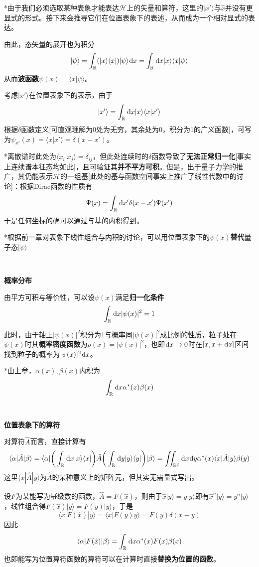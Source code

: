 \documentclass[a4paper,UTF8,fontset=windows]{ctexart}
\newcommand*{\dr}{\hspace{0.07em}\mathrm{d}}
\newcommand*{\ket}[1]{|#1\rangle}
\newcommand*{\bra}[1]{\langle#1|}
\newcommand*{\bk}[2]{\langle#1|#2\rangle}
\newcommand*{\blk}[3]{\langle#1|#2|#3\rangle}
\begin{document}
*由于我们必须选取某种表象才能表达$\mathcal{H}$上的矢量和算符，这里的$\ket{x'}$与$\hat{x}$并没有更显式的形式。接下来会推导它们在位置表象下的表述，从而成为一个相对显式的表达。

由此，态矢量的展开也为积分
$$\ket{\psi}=\int_\mathbb{R}(\ket{x}\bra{x})\ket{\psi}\dr x=\int_\mathbb{R}\dr x\ket{x}\bk{x}{\psi}$$
从而\textbf{波函数}$\psi(x)=\bk{x}{\psi}$。

考虑$\ket{x'}$在位置表象下的表示，由于
$$\ket{x'}=\int_\mathbb{R}\dr x\ket{x}\bk{x}{x'}$$
根据$\delta$函数定义[可直观理解为0处为无穷，其余处为0，积分为1的广义函数]，可写为$\psi_{x'}(x)=\bk{x}{x'}=\delta(x-x')$。

*离散谱时此处为$\bk{x_i}{x_j}=\delta_{ij}$，但此处连续时的$\delta$函数导致了\textbf{无法正常归一化}[事实上连续谱本征态均如此]，且可验证其\textbf{并不平方可积}。但是，出于量子力学的推广，其仍能表示$\mathcal{H}$的一组基[此处的基与函数空间事实上推广了线性代数中的讨论]：根据Dirac函数的性质有
$$\Psi(x)=\int_\mathbb{R}\dr x'\delta(x-x')\Psi(x')$$
于是任何坐标的确可以通过与基的内积得到。

*根据前一章对表象下线性组合与内积的讨论，可以用位置表象下的$\psi(x)$\textbf{替代}量子态$\ket{\psi}$

\

\textbf{概率分布}

由平方可积与等价性，可以设$\psi(x)$满足\textbf{归一化条件}
$$\int_\mathbb{R}\dr x|\psi(x)|^2=1$$

此时，由于轴上$|\psi(x)|^2$积分为1与概率同$|\psi(x)|^2$成比例的性质，粒子处在$\psi(x)$时其\textbf{概率密度函数}为$\rho(x)=|\psi(x)|^2$，也即$\dr x\to 0$时在$[x,x+\dr x]$区间找到粒子的概率为$|\psi(x)|^2\dr x$。

*由上章，$\alpha(x),\beta(x)$内积为
$$\int_\mathbb{R}\dr x\alpha^*(x)\beta(x)$$

\

\textbf{位置表象下的算符}

对算符$\hat{A}$而言，直接计算有
$$\blk{\alpha}{\hat{A}}{\beta}=\bra{\alpha}\bigg(\int_\mathbb{R}\dr x\ket{x}\bra{x}\bigg)\hat{A}\bigg(\int_\mathbb{R}\dr y\ket{y}\bra{y}\bigg)\ket{\beta}=\iint_{\mathbb{R}^2}\dr x\dr y\alpha^*(x)\blk{x}{\hat{A}}{y}\beta(y)$$
这里$\blk{x}{\hat{A}}{y}$为$\hat{A}$的某种意义上的矩阵元，但其实无需显式写出。

设$F$为某能写为幂级数的函数，$\hat{A}=F(\hat{x})$，则由于$\hat{x}\ket{y}=y\ket{y}$即有$\hat{x}^n\ket{y}=y^n\ket{y}$，线性组合得$F(\hat{x})\ket{y}=F(y)\ket{y}$，于是
$$\blk{x}{F(\hat{x})}{y}=\bk{x}{F(y)y}=F(y)\delta(x-y)$$
因此
$$\blk{\alpha}{F(\hat{x})}{\beta}=\int_\mathbb{R}\dr x\alpha^*(x)F(x)\beta(x)$$
也即能写为位置算符函数的算符可以在计算时直接\textbf{替换为位置的函数}。
\end{document}
